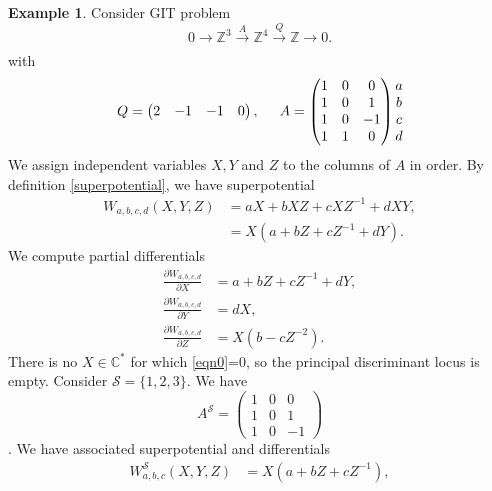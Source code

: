 \documentclass[oneside]{amsart}
\theoremstyle{definition}
\theoremstyle{definition}
\theoremstyle{definition}
\newtheorem{example}{Example} [section]
\theoremstyle{definition}
\newcommand{\CC}{\mathbb{C}}
\newcommand{\Z}{\mathbb{Z}}
\begin{document}
\begin{example}
    \label{exmpdisc}
    \label{components}
    Consider GIT problem 
    $$
    0 \xrightarrow[]{} \Z^3 \xrightarrow[]{A} \Z^4 \xrightarrow[]{Q} \Z \xrightarrow[]{} 0.
    $$
    with
    $$
    Q = 
    \begin{pmatrix}
        2 & -1 & -1 & 0
    \end{pmatrix},
    \hspace{0.5cm}
    A =
    \begin{pmatrix}
        1 & 0 & 0 \\
        1 & 0 & 1 \\
        1 & 0 & -1 \\
        1 & 1 & 0
    \end{pmatrix}
    \begin{matrix}
        a \\
        b \\
        c \\
        d
    \end{matrix}
    $$
    We assign independent variables $X,Y$ and $Z$ to the columns of $A$ in order. By definition \eqref{superpotential}, we have superpotential
    \begin{align*}
    W_{a,b,c,d}(X,Y,Z) &= aX + b XZ + c X Z^{-1} + dXY,\\
                        & = X(a + bZ + c Z^{-1} + dY).
    \end{align*}
    We compute partial differentials
    \begin{align}
        \frac{\partial W_{a,b,c,d}}{\partial X} &= a + bZ +cZ^{-1} + dY, \\
        \label{eqn0}
        \frac{\partial W_{a,b,c,d}}{\partial Y} &=dX, \\
        \frac{\partial W_{a,b,c,d}}{\partial Z} &= X(b - cZ^{-2}).
    \end{align}
    There is no $X \in \CC^*$ for which \eqref{eqn0}=0, so the principal discriminant locus is empty. Consider $\mathcal{S} = \{1,2,3 \}$. We have 
    $$
    A^{\mathcal{S}} =
    \begin{pmatrix}
        1 & 0 & 0  \\
        1 & 0 & 1  \\
        1 & 0 & -1 
    \end{pmatrix}
    $$.
    We have associated superpotential and differentials
    \begin{align}
        W_{a,b,c}^{\mathcal{S}}(X,Y,Z)  &= X(a + bZ + c Z^{-1} ), 
        \nonumber \\

\end{align}
\end{example}
\end{document}

